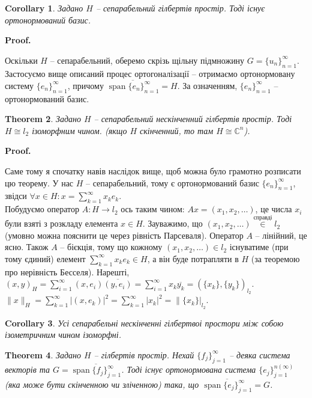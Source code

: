 \documentclass[a4paper, 10pt]{article}
\makeatletter
\theoremstyle{theoremdd}
\newtheorem{theorem}{Theorem}[subsection]
\theoremstyle{theoremdd}
\theoremstyle{theoremdd}
\theoremstyle{theoremdd}
\theoremstyle{theoremdd}
\theoremstyle{theoremdd}
\theoremstyle{theoremdd}
\theoremstyle{theoremdd}
\newtheorem{corollary}[theorem]{Corollary}
\renewenvironment{proof}[1][Proof.\\]{\par
\pushQED{\hfill \qed}%
\normalfont \topsep6\p@\@plus6\p@\relax
\trivlist
\item\relax
{\bfseries
#1\@addpunct{.}}\hspace\labelsep\ignorespaces
}{%
\popQED\endtrivlist\@endpefalse
}
\DeclareMathOperator{\linspan}{span}
\makeatother
\begin{document}
\begin{corollary}
Задано $H$ -- сепарабельний гілбертів простір. Тоді існує ортонормований базис.
\end{corollary}

\begin{proof}
Оскільки $H$ -- сепарабельний, оберемо скрізь щільну підмножину $G = \{u_n\}_{n=1}^\infty$. Застосуємо вище описаний процес ортогоналізації -- отримаємо ортонормовану систему $\{e_n\}_{n=1}^\infty$, причому $\overline{\linspan\{e_n\}_{n=1}^\infty} = H$. За означенням, $\{e_n\}_{n=1}^\infty$ -- ортонормований базис.
\end{proof}

\begin{theorem}
Задано $H$ -- сепарабельний нескінченний гілбертів простір. Тоді $H \cong l_2$ ізоморфним чином. (якщо $H$ скінченний, то там $H \cong \mathbb{C}^n$).
\end{theorem}

\begin{proof}
Саме тому я спочатку навів наслідок вище, щоб можна було грамотно розписати цю теорему. У нас $H$ -- сепарабельний, тому є ортонормований базис $\{e_n\}_{n=1}^\infty$, звідси $\forall x \in H: x = \displaystyle\sum_{k=1}^\infty x_k e_k$.\\
Побудуємо оператор $A \colon H \to l_2$ ось таким чином: $Ax = (x_1,x_2,\dots)$, це числа $x_i$ були взяті з розкладу елемента $x \in H$. Зауважимо, що $(x_1,x_2,\dots) \overset{\text{справді}}{\in} l_2$ (умовно можна пояснити це через рівність Парсеваля). Оператор $A$ -- лінійний, це ясно. Також $A$ -- бієкція, тому що кожному $(x_1,x_2,\dots) \in l_2$ існуватиме (при тому єдиний) елемент $\displaystyle\sum_{k=1}^\infty x_k e_k \in H$, а він буде потрапляти в $H$ (за теоремою про нерівність Бесселя). Нарешті,\\
$(x,y)_H = \displaystyle\sum_{i=1}^\infty (x,e_i) \overline{(y,e_i)} = \sum_{i=1}^\infty x_k \overline{y_k} = (\{x_k\},\{y_k\})_{l_2}$.\\
$\|x\|_H = \displaystyle\sum_{k=1}^\infty |(x,e_k)|^2 = \sum_{k=1}^\infty |x_k|^2 = \| \{x_k\}|_{l_2}$.
\end{proof}

\begin{corollary}
Усі сепарабельні нескінченні гілбертвоі простори між собою ізометричним чином ізоморфні.
\end{corollary}

\iffalse
\begin{theorem}
Задано $H$ -- гілбертів простір. Нехай $\{f_j\}_{j=1}^\infty$ -- деяка система векторів та $G = \overline{\linspan\{f_j\}_{j=1}^\infty}$. Тоді існує ортонормована система $\{e_j\}_{j=1}^{n (\infty)}$ (яка може бути скінченною чи зліченною) така, що $\overline{\linspan\{e_j\}_{j=1}^\infty} = G$.
\end{theorem}
\end{document}
